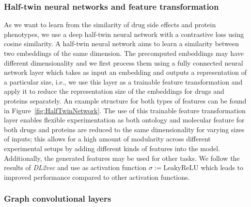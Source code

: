 \documentclass{bioinfo}
\renewcommand{\cite}{\citep}
\begin{document}
\subsubsection{Half-twin neural networks and feature transformation}

As we want to learn from the similarity of drug side effects and
protein phenotypes, we use a deep half-twin neural network with a
contrastive loss using cosine similarity.  A half-twin neural network
aims to learn a similarity between two embeddings of the same
dimension.  The precomputed embeddings may have different
dimensionality and we first process them using a fully connected
neural network layer which takes as input an embedding and outputs a
representation of a particular size, i.e., we use this layer as a
trainable feature transformation and apply it to reduce the
representation size of the embeddings for drugs and proteins
separately.  An example structure for both types of features can be
found in Figure~\ref{fig:HalfTwinNetwork}.
The use of this trainable feature transformation layer enables
flexible experimentation as both ontology and molecular feature for
both drugs and proteins are reduced to the same dimensionality for
varying sizes of inputs; this allows for a high amount of modularity
across different experimental setups by adding different kinds of
features into the model. Additionally, the generated features may be
used for other tasks. %
We follow the results of \textit{DL2vec} \cite{} and use as
activation function $\sigma := \mathrm{LeakyReLU}$ which leads to
improved performance compared to other activation functions.


\subsubsection{Graph convolutional layers}
\end{document}
